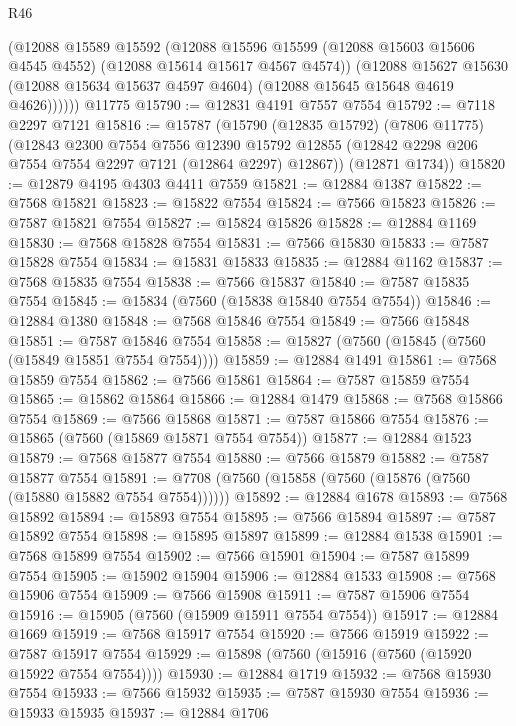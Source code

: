 \begin{lexlean}{R46}
\begin{coremodule}
          (@12088
            @15589
            @15592
            (@12088
              @15596
              @15599
              (@12088 @15603 @15606 @4545 @4552)
              (@12088 @15614 @15617 @4567 @4574))
            (@12088
              @15627
              @15630
              (@12088 @15634 @15637 @4597 @4604)
              (@12088 @15645 @15648 @4619 @4626))))))
    @11775
@15790 := @12831 @4191 @7557 @7554
@15792 := @7118 @2297 @7121
@15816 := @15787
    (@15790
      (@12835 @15792)
      (@7806 @11775)
      (@12843
        @2300
        @7554
        @7556
        @12390
        @15792
        @12855
        (@12842 @2298 @206 @7554 @7554 @2297 @7121 (@12864 @2297) @12867))
      (@12871 @1734))
@15820 := @12879 @4195 @4303 @4411 @7559
@15821 := @12884 @1387
@15822 := @7568 @15821
@15823 := @15822 @7554
@15824 := @7566 @15823
@15826 := @7587 @15821 @7554
@15827 := @15824 @15826
@15828 := @12884 @1169
@15830 := @7568 @15828 @7554
@15831 := @7566 @15830
@15833 := @7587 @15828 @7554
@15834 := @15831 @15833
@15835 := @12884 @1162
@15837 := @7568 @15835 @7554
@15838 := @7566 @15837
@15840 := @7587 @15835 @7554
@15845 := @15834 (@7560 (@15838 @15840 @7554 @7554))
@15846 := @12884 @1380
@15848 := @7568 @15846 @7554
@15849 := @7566 @15848
@15851 := @7587 @15846 @7554
@15858 := @15827 (@7560 (@15845 (@7560 (@15849 @15851 @7554 @7554))))
@15859 := @12884 @1491
@15861 := @7568 @15859 @7554
@15862 := @7566 @15861
@15864 := @7587 @15859 @7554
@15865 := @15862 @15864
@15866 := @12884 @1479
@15868 := @7568 @15866 @7554
@15869 := @7566 @15868
@15871 := @7587 @15866 @7554
@15876 := @15865 (@7560 (@15869 @15871 @7554 @7554))
@15877 := @12884 @1523
@15879 := @7568 @15877 @7554
@15880 := @7566 @15879
@15882 := @7587 @15877 @7554
@15891 := @7708 (@7560 (@15858 (@7560 (@15876 (@7560 (@15880 @15882 @7554 @7554))))))
@15892 := @12884 @1678
@15893 := @7568 @15892
@15894 := @15893 @7554
@15895 := @7566 @15894
@15897 := @7587 @15892 @7554
@15898 := @15895 @15897
@15899 := @12884 @1538
@15901 := @7568 @15899 @7554
@15902 := @7566 @15901
@15904 := @7587 @15899 @7554
@15905 := @15902 @15904
@15906 := @12884 @1533
@15908 := @7568 @15906 @7554
@15909 := @7566 @15908
@15911 := @7587 @15906 @7554
@15916 := @15905 (@7560 (@15909 @15911 @7554 @7554))
@15917 := @12884 @1669
@15919 := @7568 @15917 @7554
@15920 := @7566 @15919
@15922 := @7587 @15917 @7554
@15929 := @15898 (@7560 (@15916 (@7560 (@15920 @15922 @7554 @7554))))
@15930 := @12884 @1719
@15932 := @7568 @15930 @7554
@15933 := @7566 @15932
@15935 := @7587 @15930 @7554
@15936 := @15933 @15935
@15937 := @12884 @1706

\end{coremodule}
\end{lexlean}
